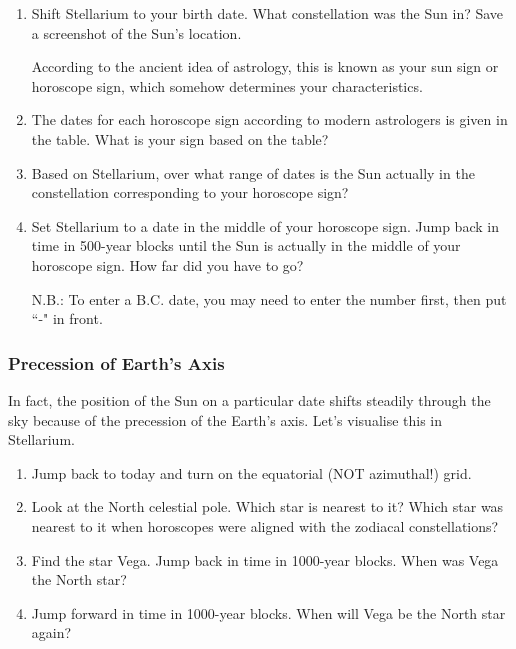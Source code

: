 \documentclass[main.tex]{subfiles}
\begin{document}
\begin{enumerate}
\item Shift Stellarium to your birth date. What constellation was the Sun in? Save a screenshot of the Sun's location.

According to the ancient idea of astrology, this is known as your sun sign or horoscope sign, which somehow determines your characteristics.
\item The dates for each horoscope sign according to modern astrologers is given in the table. What is your sign based on the table?
\item Based on Stellarium, over what range of dates is the Sun actually in the constellation corresponding to your horoscope sign?
\item Set Stellarium to a date in the middle of your horoscope sign. Jump back in time in 500-year blocks until the Sun is actually in the middle of your horoscope sign. How far did you have to go?

N.B.: To enter a B.C. date, you may need to enter the number first, then put ``-" in front.
\end{enumerate}

\subsubsection{Precession of Earth's Axis}
In fact, the position of the Sun on a particular date shifts steadily through the sky because of the precession of the Earth's axis. Let's visualise this in Stellarium.
\begin{enumerate}
\item Jump back to today and turn on the equatorial (NOT azimuthal!) grid.
\item Look at the North celestial pole. Which star is nearest to it? Which star was nearest to it when horoscopes were aligned with the zodiacal constellations?
\item Find the star Vega. Jump back in time in 1000-year blocks. When was Vega the North star?
\item Jump forward in time in 1000-year blocks. When will Vega be the North star again?
\end{enumerate}
\end{document}
